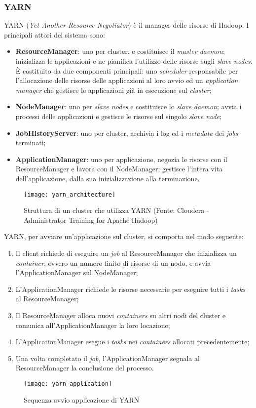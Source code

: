 \subsubsection{YARN}
YARN (\textit{Yet Another Resource Negotiator}) è il manager delle risorse di Hadoop. I principali attori del sistema sono:
\begin{itemize}
	\item \textbf{ResourceManager}: uno per \gls{cluster}, e costituisce il \textit{master \gls{daemon}}; inizializza le applicazioni e ne pianifica l'utilizzo delle risorse sugli \textit{slave nodes}. È costituito da due componenti principali: uno \textit{scheduler} responsabile per l'allocazione delle risorse delle applicazioni al loro avvio ed un \textit{application manager} che gestisce le applicazioni già in esecuzione sul \textit{cluster};
	\item \textbf{NodeManager}: uno per \textit{slave nodes} e costituisce lo \textit{slave \gls{daemon}}; avvia i processi delle applicazioni e gestisce le risorse sul singolo \textit{slave node};
	\item \textbf{JobHistoryServer}: uno per \gls{cluster}, archivia i log ed i \textit{metadata} dei \textit{jobs} terminati;
	\item \textbf{ApplicationManager}: uno per applicazione, negozia le risorse con il ResourceManager e lavora con il NodeManager; gestisce l'intera vita dell'applicazione, dalla sua inizializzazione alla terminazione. 
\end{itemize}
\begin{figure}[!h]
	\centering
	\texttt{[image: yarn\_architecture]}
	\caption{Struttura di un cluster che utilizza YARN (Fonte: Cloudera - Administrator Training for Apache Hadoop)}
\end{figure}
YARN, per avviare un'applicazione sul \gls{cluster}, si comporta nel modo seguente:
\begin{enumerate}
	\item Il client richiede di eseguire un \textit{job} al ResourceManager che inizializza un \textit{container}, ovvero un numero finito di risorse di un nodo, e avvia l'ApplicationManager sul NodeManager;
	\item L'ApplicationManager richiede le risorse necessarie per eseguire tutti i \textit{tasks} al ResourceManager;
	\item Il ResourceManager alloca nuovi \textit{containers} su altri nodi del \gls{cluster} e comunica all'ApplicationManager la loro locazione;
	\item L'ApplicationManager esegue i \textit{tasks} nei \textit{containers} allocati precedentemente;
	\item Una volta completato il \textit{job}, l'ApplicationManager segnala al ResourceManager la conclusione del processo.
\end{enumerate} 
\begin{figure}[!h]
	\centering
	\texttt{[image: yarn\_application]}
	\caption{Sequenza avvio applicazione di YARN}
\end{figure}
\clearpage
